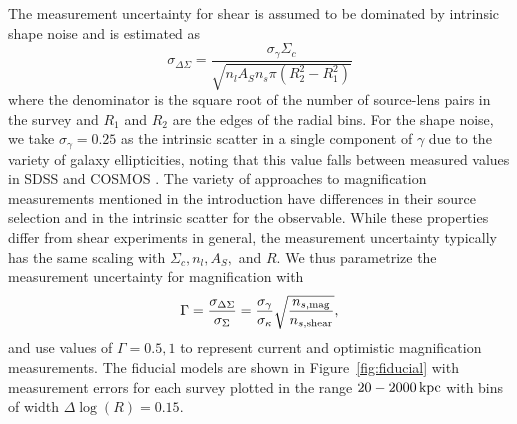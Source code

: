 \documentclass[12pt]{emulateapj}
\begin{document}
The measurement uncertainty for shear is assumed to be dominated by
intrinsic shape noise and is estimated as
\begin{equation}
\sigma_{\Delta\Sigma}=\frac{\sigma_{\gamma}\Sigma_c}{\sqrt{n_l A_S n_s
  \pi(R_2^2-R_1^2)}}
\end{equation}
where the denominator is the square root of the number of source-lens
pairs in the survey and $R_1$ and $R_2$ are the edges of the radial
bins. For the shape noise, we take
$\sigma_{\gamma}=0.25$ as the intrinsic scatter in a single component
of $\gamma$ due to the variety of galaxy ellipticities, noting that this
value falls between measured values in SDSS \citep{Hirata2004} and
COSMOS \citep{Leauthaud2007}. The variety of approaches to
magnification measurements mentioned in the introduction have
differences in their source selection and in the intrinsic scatter for
the observable. While these properties differ from shear experiments
in general, the measurement uncertainty typically 
has the same scaling with $\Sigma_c, n_l, A_S,$ and $R$. We thus
parametrize the measurement uncertainty for magnification with 
\begin{equation}
\Gamma = \frac{\sigma_{\Delta\Sigma}}{\sigma_{\Sigma}} =
\frac{\sigma_\gamma}{\sigma_\kappa}\sqrt{\frac{n_{s, \rm{mag}}}{n_{s, \rm{shear}}}},
\end{equation}
and use values of $\Gamma=0.5, 1$ to represent current and optimistic
magnification measurements. The fiducial models are shown in
Figure~\ref{fig:fiducial} with measurement errors for each survey
plotted in the range $20-2000\,{\rm kpc}$ with bins of width
$\Delta\log(R)=0.15$.

\begin{figure*}[htb]
\caption{Magnification ($\Sigma(R)$; left) and shear
  ($\Delta\Sigma(R)$; right) profiles for fiducial galaxy and cluster models with
  parameters given in Table~\ref{tab:model} and error bars predicted
  from the survey parameters in Table~\ref{tab:survey}. Errors for
  both surveys on the cluster sample and for LSST on the galaxy sample
are similar to the line widths.}
\label{fig:fiducial}
\end{figure*}
\end{document}
